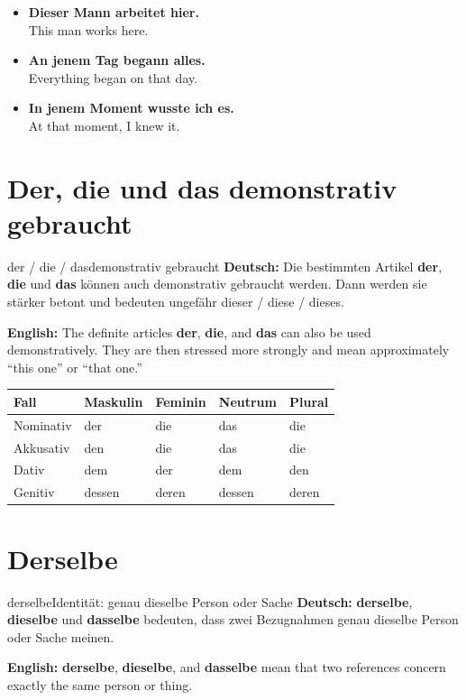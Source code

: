 \documentclass[a4paper,11pt]{article}
\newcommand{\GermanText}[1]{\textbf{Deutsch: }#1\par}
\newcommand{\EnglishText}[1]{{\small\color{SoftGray}\textbf{English: }#1\par}}
\newcommand{\ExampleItem}[2]{\item \textbf{#1}\\{\small\color{SoftGray}#2}}
\newcommand{\HeaderRow}{\rowcolor{HeaderBlueDark}\color{white}\bfseries Fall & \color{white}\bfseries Maskulin & \color{white}\bfseries Feminin & \color{white}\bfseries Neutrum & \color{white}\bfseries Plural \\}
\begin{document}
\begin{exbox}
\begin{itemize}
\ExampleItem{Dieser Mann arbeitet hier.}{This man works here.}
\ExampleItem{An jenem Tag begann alles.}{Everything began on that day.}
\ExampleItem{In jenem Moment wusste ich es.}{At that moment, I knew it.}
\end{itemize}
\end{exbox}

\section{Der, die und das demonstrativ gebraucht}
\begin{grammarentry}{der / die / das}{demonstrativ gebraucht}
\GermanText{Die bestimmten Artikel \textbf{der}, \textbf{die} und \textbf{das} können auch demonstrativ gebraucht werden. Dann werden sie stärker betont und bedeuten ungefähr \glqq dieser / diese / dieses\grqq.}
\EnglishText{The definite articles \textbf{der}, \textbf{die}, and \textbf{das} can also be used demonstratively. They are then stressed more strongly and mean approximately ``this one'' or ``that one.''}
\end{grammarentry}

\begin{center}
\begin{tabular}{|>{\centering\arraybackslash}m{2.2cm}|>{\centering\arraybackslash}m{2.5cm}|>{\centering\arraybackslash}m{2.5cm}|>{\centering\arraybackslash}m{2.5cm}|>{\centering\arraybackslash}m{2.5cm}|}
\hline
\HeaderRow
\hline
\rowcolor{RowBlueLight}Nominativ & der & die & das & die \\
\hline
\rowcolor{RowBlueDark}Akkusativ & den & die & das & die \\
\hline
\rowcolor{RowBlueLight}Dativ & dem & der & dem & den \\
\hline
\rowcolor{RowBlueDark}Genitiv & dessen & deren & dessen & deren \\
\hline
\end{tabular}
\end{center}

\section{Derselbe}
\begin{grammarentry}{derselbe}{Identität: genau dieselbe Person oder Sache}
\GermanText{\textbf{derselbe}, \textbf{dieselbe} und \textbf{dasselbe} bedeuten, dass zwei Bezugnahmen genau dieselbe Person oder Sache meinen.}
\EnglishText{\textbf{derselbe}, \textbf{dieselbe}, and \textbf{dasselbe} mean that two references concern exactly the same person or thing.}
\end{grammarentry}
\end{document}
